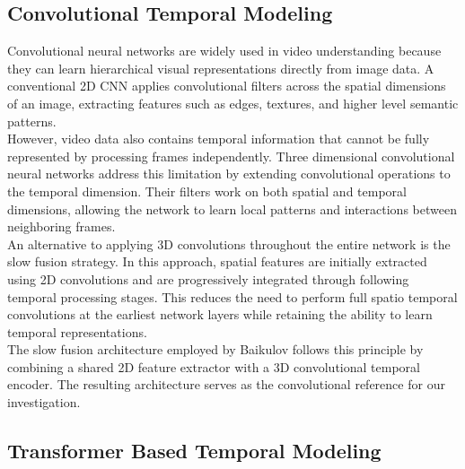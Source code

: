 \documentclass[conference]{IEEEtran}
\begin{document}
\subsection{Convolutional Temporal Modeling}

Convolutional neural networks are widely used in video understanding because they can learn hierarchical visual representations directly from image data. A conventional 2D CNN applies convolutional filters across the spatial dimensions of an image, extracting features such as edges, textures, and higher level semantic patterns.\\
However, video data also contains temporal information that cannot be fully represented by processing frames independently. Three dimensional convolutional neural networks address this limitation by extending convolutional operations to the temporal dimension. Their filters work on both spatial and temporal dimensions, allowing the network to learn local patterns and interactions between neighboring frames.\\
An alternative to applying 3D convolutions throughout the entire network is the slow fusion strategy. In this approach, spatial features are initially extracted using 2D convolutions and are progressively integrated through following temporal processing stages. This reduces the need to perform full spatio temporal convolutions at the earliest network layers while retaining the ability to learn temporal representations.\\
The slow fusion architecture employed by Baikulov \cite{Baikulov2023} follows this principle by combining a shared 2D feature extractor with a 3D convolutional temporal encoder. The resulting architecture serves as the convolutional reference for our investigation.\\

\subsection{Transformer Based Temporal Modeling}
\end{document}
